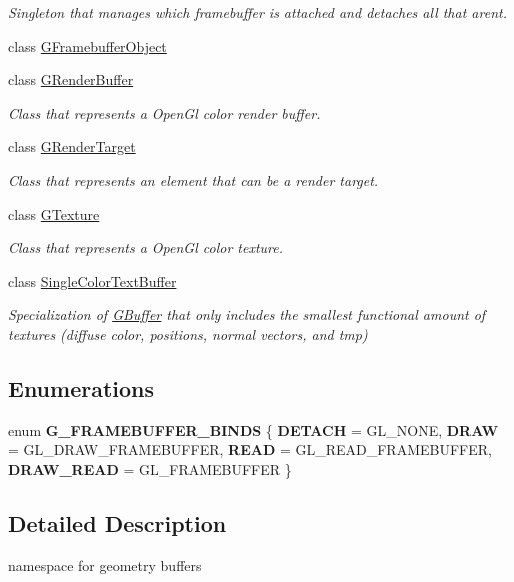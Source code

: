\begin{DoxyCompactItemize}
\begin{DoxyCompactList}\small\item\em Singleton that manages which framebuffer is attached and detaches all that aren\textquotesingle{}t. \end{DoxyCompactList}\item 
class \mbox{\hyperlink{class_geometry_engine_1_1_geometry_buffer_1_1_g_framebuffer_object}{G\+Framebuffer\+Object}}
\item 
class \mbox{\hyperlink{class_geometry_engine_1_1_geometry_buffer_1_1_g_render_buffer}{G\+Render\+Buffer}}
\begin{DoxyCompactList}\small\item\em Class that represents a Open\+Gl color render buffer. \end{DoxyCompactList}\item 
class \mbox{\hyperlink{class_geometry_engine_1_1_geometry_buffer_1_1_g_render_target}{G\+Render\+Target}}
\begin{DoxyCompactList}\small\item\em Class that represents an element that can be a render target. \end{DoxyCompactList}\item 
class \mbox{\hyperlink{class_geometry_engine_1_1_geometry_buffer_1_1_g_texture}{G\+Texture}}
\begin{DoxyCompactList}\small\item\em Class that represents a Open\+Gl color texture. \end{DoxyCompactList}\item 
class \mbox{\hyperlink{class_geometry_engine_1_1_geometry_buffer_1_1_single_color_text_buffer}{Single\+Color\+Text\+Buffer}}
\begin{DoxyCompactList}\small\item\em Specialization of \mbox{\hyperlink{class_geometry_engine_1_1_geometry_buffer_1_1_g_buffer}{G\+Buffer}} that only includes the smallest functional amount of textures (diffuse color, positions, normal vectors, and tmp) \end{DoxyCompactList}\end{DoxyCompactItemize}
\subsection*{Enumerations}
\begin{DoxyCompactItemize}
\item 
\mbox{\label{namespace_geometry_engine_1_1_geometry_buffer_ae4923c87de2056a1df7228000a2fbad9}} 
enum {\bfseries G\+\_\+\+F\+R\+A\+M\+E\+B\+U\+F\+F\+E\+R\+\_\+\+B\+I\+N\+DS} \{ {\bfseries D\+E\+T\+A\+CH} = G\+L\+\_\+\+N\+O\+NE, 
{\bfseries D\+R\+AW} = G\+L\+\_\+\+D\+R\+A\+W\+\_\+\+F\+R\+A\+M\+E\+B\+U\+F\+F\+ER, 
{\bfseries R\+E\+AD} = G\+L\+\_\+\+R\+E\+A\+D\+\_\+\+F\+R\+A\+M\+E\+B\+U\+F\+F\+ER, 
{\bfseries D\+R\+A\+W\+\_\+\+R\+E\+AD} = G\+L\+\_\+\+F\+R\+A\+M\+E\+B\+U\+F\+F\+ER
 \}
\end{DoxyCompactItemize}


\subsection{Detailed Description}
namespace for geometry buffers 